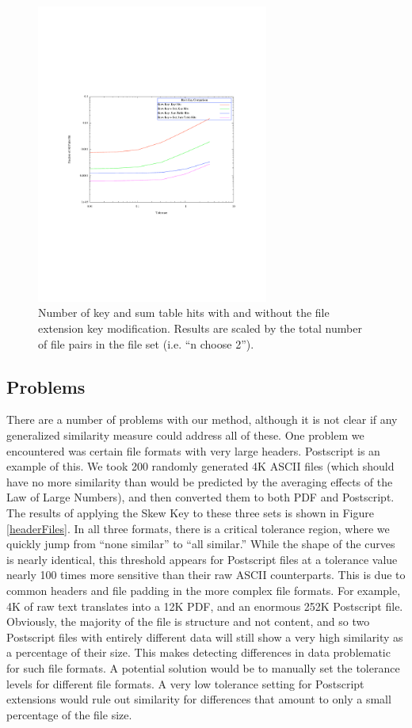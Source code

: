 \documentclass[10pt, twocolumn]{article}
\begin{document}
 \begin{figure}[t] 
 \centering
\includegraphics[width= 3in]{PairwiseElim.pdf}
\caption{Number of key and sum table hits with and without the file extension key modification.  Results are scaled by the total number of file pairs in the file set (i.e. ``n choose 2'').  }
\label{PairwiseSavings} 
\end{figure}


\subsection{Problems}

There are a number of problems with our method, although it is not clear if any  generalized similarity measure could address all of these.  One problem we encountered was certain file formats with very large headers.  Postscript is an example of this.  We took 200 randomly generated 4K ASCII files (which should have no more similarity than would be predicted by the averaging effects of the Law of Large Numbers), and then converted them to both PDF and Postscript.  The results of applying the Skew Key to these three sets is shown in Figure \ref{headerFiles}.  In all three formats, there is a critical tolerance region, where we quickly jump from ``none similar'' to ``all similar.''  While the shape of the curves is nearly identical, this threshold appears for Postscript files at a tolerance value nearly 100 times more sensitive than their raw ASCII counterparts.  This is due to common headers and file padding in the more complex file formats.  For example, 4K of raw text translates into a 12K PDF, and an enormous 252K Postscript file.  Obviously, the majority of the file is structure and not content, and so two Postscript files with entirely different data will still show a very high similarity as a percentage of their size.  This makes detecting differences in data problematic for such file formats.  A potential solution would be to manually set the tolerance levels for different file formats.  A very low tolerance setting for Postscript extensions would rule out similarity for differences that amount to only a small percentage of the file size.
\end{document}

